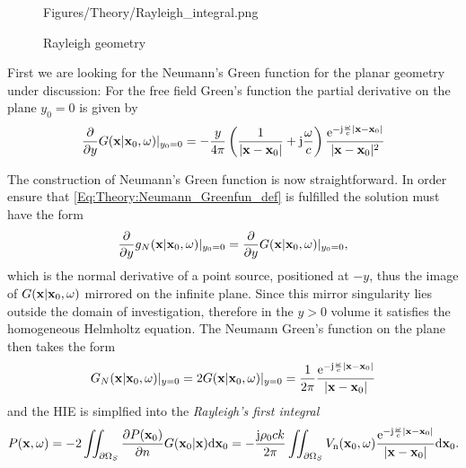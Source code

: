 \begin{figure}
	\centering
	\begin{overpic}[width = .5\columnwidth]{Figures/Theory/Rayleigh_integral.png}
	\end{overpic}
	\caption{Rayleigh geometry}
	\label{Fig:Theory:Rayleigh_geometry}
\end{figure}
\vspace{3mm}
First we are looking for the Neumann's Green function for the planar geometry under discussion:
For the free field Green's function the partial derivative on the plane $y_0 = 0$ is given by
\begin{equation}
\frac{\partial}{\partial y} G(\mathbf{x}|\mathbf{x}_0,\omega)|_{y_0 = 0} = 
- \frac{y}{4\pi}\left( \frac{1}{| \mathbf{x} - \mathbf{x}_0 |} + \mathrm{j} \frac{\omega}{c} \right) 
\frac{\mathrm{e}^{-\mathrm{j} \frac{\omega}{c}  | \mathbf{x} - \mathbf{x}_0 | }}{| \mathbf{x} - \mathbf{x}_0 |^2}
\label{Eq:Theory:monopole_y_derivative}
\end{equation}

The construction of Neumann's Green function is now straightforward. In order ensure that \eqref{Eq:Theory:Neumann_Greenfun_def} is fulfilled the solution must have the form
\begin{equation}
\frac{\partial}{\partial y} g_N(\mathbf{x}|\mathbf{x}_0,\omega)|_{y_0 = 0} = \frac{\partial}{\partial y} G(\mathbf{x}|\mathbf{x}_0,\omega)|_{y_0 = 0},
\end{equation}
which is the normal derivative of a point source, positioned at $-y$, thus the image of $G(\mathbf{x}|\mathbf{x}_0,\omega)$ mirrored on the infinite plane. Since this mirror singularity lies outside the domain of investigation, therefore in the $y > 0$ volume it satisfies the homogeneous Helmholtz equation. The Neumann Green's function on the plane then takes the form
\begin{equation}
G_N(\mathbf{x}|\mathbf{x}_0, \omega)|_{y = 0} = 
2G(\mathbf{x}|\mathbf{x}_0, \omega)|_{y = 0} = 
\frac{1}{2\pi} \frac{\mathrm{e}^{-\mathrm{j} \frac{\omega}{c} |\mathbf{x}-\mathbf{x}_0|}}{ |\mathbf{x}-\mathbf{x}_0| }
\end{equation}
and the HIE is simplfied into the \emph{Rayleigh's first integral} \cite{Berkhout1984}
\begin{multline}
P(\mathbf{x},\omega) =
- 2 \iint_{\partial \Omega_S} \frac{\partial P(\mathbf{x}_0)}{\partial n} G(\mathbf{x}_0|\mathbf{x}) \mathrm{d} \mathbf{x}_0 
=
 - \frac{\mathrm{j} \rho_0 c k}{2\pi} \iint_{\partial \Omega_S} V_{\mathrm{n}}(\mathbf{x}_0,\omega)   \frac{\mathrm{e}^{-\mathrm{j} \frac{\omega}{c} |\mathbf{x}-\mathbf{x}_0|}}{ |\mathbf{x}-\mathbf{x}_0| } \mathrm{d} \mathbf{x}_0.
\label{Eq:Theory:RayleighI}
\end{multline}

